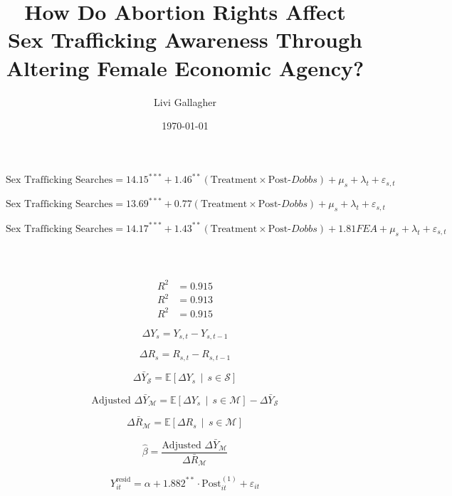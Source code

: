\documentclass[12pt]{article}
\begin{document}
\title{How Do Abortion Rights Affect Sex Trafficking Awareness Through Altering Female Economic Agency?}
\author{Livi Gallagher}
\date{\today}
\maketitle


\begin{equation}
\text{Sex Trafficking Searches}
= 14.15^{***} + \mathbf{1.46^{**}} (\text{Treatment} \times \text{Post-}\textit{Dobbs}) + \mu_{s} + \lambda_{t}
+ \varepsilon_{s,t}
\end{equation}

\begin{equation}
\text{Sex Trafficking Searches}
= 13.69^{***} + \mathbf{0.77} (\text{Treatment} \times \text{Post-}\textit{Dobbs}) + \mu_{s} + \lambda_{t}
+ \varepsilon_{s,t}
\end{equation}


\begin{equation}
\text{Sex Trafficking Searches}
= 14.17^{***} + {1.43}^{**} (\text{Treatment} \times \text{Post-}\textit{Dobbs}) + \mathbf{1.81}{FEA} + \mu_{s} + \lambda_{t}
+ \varepsilon_{s,t}
\end{equation}
\\ 
\\
\\
\begin{align}
R^2 &= 0.915 \\
R^2 &= 0.913 \\
R^2 &= 0.915
\end{align}


\begin{equation}
\Delta Y_s = Y_{s,t} - Y_{s,t-1}
\end{equation}

\begin{equation}
\Delta R_s = R_{s,t} - R_{s,t-1}
\end{equation}

\begin{equation}
\Delta \bar{Y}_{\mathcal{S}} = \mathbb{E}\left[ \Delta Y_s \,\middle|\, s \in \mathcal{S} \right]
\end{equation}

\begin{equation}
\text{Adjusted } \Delta \bar{Y}_{\mathcal{M}} 
= \mathbb{E}\left[\Delta Y_s \,\middle|\, s \in \mathcal{M}\right]
- \Delta \bar{Y}_{\mathcal{S}}
\end{equation}

\begin{equation}
\Delta \bar{R}_{\mathcal{M}} = \mathbb{E}\left[\Delta R_s \,\middle|\, s \in \mathcal{M}\right]
\end{equation}

\begin{equation}
\hat{\beta} = \frac{\text{Adjusted } \Delta \bar{Y}_{\mathcal{M}}}{\Delta \bar{R}_{\mathcal{M}}}
\end{equation}  



\begin{equation}
Y_{it}^{\text{resid}} = \alpha + \mathbf{1.882^{**}} \cdot \text{Post}_{it}^{(1)} + \varepsilon_{it}
\end{equation}
\end{document}
